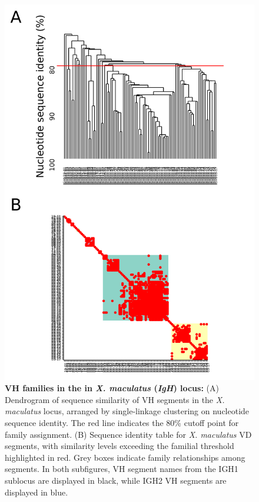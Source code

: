 		\begin{figure}
	\centering
	\includegraphics[width=\textwidth]{_Figures/png/xma-vh-families} %
	\caption[VH families in the in \textit{X. maculatus} \textit{IgH} locus]{\textbf{VH families in the in \textit{X. maculatus} (\textit{IgH}) locus:} (A) Dendrogram of sequence similarity of VH segments in the \textit{X. maculatus} locus, arranged by single-linkage clustering on nucleotide sequence identity. The red line indicates the 80\% cutoff point for family assignment. (B) Sequence identity table for \textit{X. maculatus} VD segments, with similarity levels exceeding the familial threshold highlighted in red. Grey boxes indicate family relationships among segments. In both subfigures, VH segment names from the IGH1 sublocus are displayed in black, while IGH2 VH segments are displayed in blue.}
	\label{fig:xma-vh-families}
	\end{figure}

